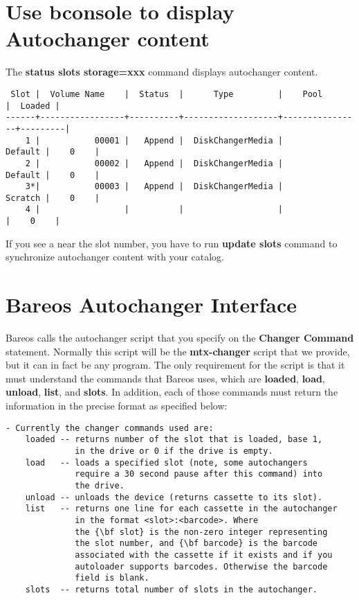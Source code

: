 \section{Use bconsole to display Autochanger content}

The {\bf status slots storage=xxx} command displays autochanger content.

\footnotesize
\begin{verbatim}
 Slot |  Volume Name    |  Status  |      Type         |    Pool        |  Loaded |
------+-----------------+----------+-------------------+----------------+---------|
    1 |           00001 |   Append |  DiskChangerMedia |        Default |    0    |
    2 |           00002 |   Append |  DiskChangerMedia |        Default |    0    |
    3*|           00003 |   Append |  DiskChangerMedia |        Scratch |    0    |
    4 |                 |          |                   |                |    0    |
\end{verbatim}
\normalsize

If you see a {\bf *} near the slot number, you have to run {\bf update slots}
command to synchronize autochanger content with your catalog.



\section{Bareos Autochanger Interface}
\label{autochanger-interface}

Bareos calls the autochanger script that you specify on the {\bf Changer
Command} statement. Normally this script will be the {\bf mtx-changer} script
that we provide, but it can in fact be any program. The only requirement
for the script is that it must understand the commands that
Bareos uses, which are {\bf loaded}, {\bf load}, {\bf
unload}, {\bf list}, and {\bf slots}. In addition,
each of those commands must return the information in the precise format as
specified below:

\footnotesize
\begin{verbatim}
- Currently the changer commands used are:
    loaded -- returns number of the slot that is loaded, base 1,
              in the drive or 0 if the drive is empty.
    load   -- loads a specified slot (note, some autochangers
              require a 30 second pause after this command) into
              the drive.
    unload -- unloads the device (returns cassette to its slot).
    list   -- returns one line for each cassette in the autochanger
              in the format <slot>:<barcode>. Where
              the {\bf slot} is the non-zero integer representing
              the slot number, and {\bf barcode} is the barcode
              associated with the cassette if it exists and if you
              autoloader supports barcodes. Otherwise the barcode
              field is blank.
    slots  -- returns total number of slots in the autochanger.
\end{verbatim}
\normalsize

